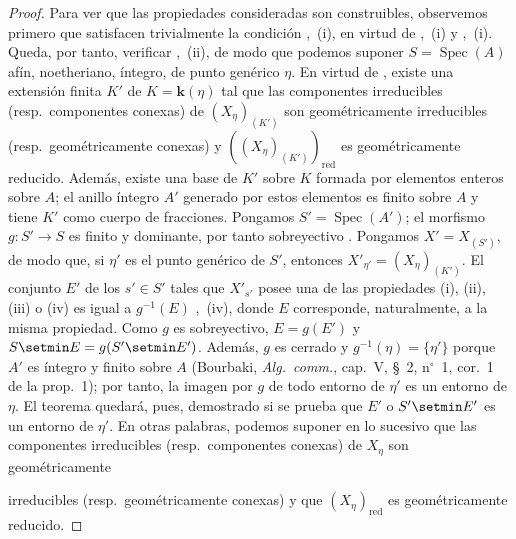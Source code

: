 \begin{proof}
Para ver que las propiedades consideradas son construibles, observemos primero que satisfacen trivialmente la condición ,~(i), en virtud de ,~(i) y ,~(i).
Queda, por tanto, verificar ,~(ii), de modo que podemos suponer $S=\operatorname{Spec}(A)$ afín, noetheriano, íntegro, de punto genérico $\eta$.
En virtud de , existe una extensión finita $K'$ de $K=\boldsymbol{k}(\eta)$ tal que las componentes irreducibles (resp.\ componentes conexas) de $(X_\eta)_{(K')}$ son geométricamente irreducibles (resp.\ geométricamente conexas) y $((X_\eta)_{(K')})_\mathrm{red}$ es geométricamente reducido.
Además, existe una base de $K'$ sobre $K$ formada por elementos enteros sobre $A$; el anillo íntegro $A'$ generado por estos elementos es finito sobre $A$ y tiene $K'$ como cuerpo de fracciones.
Pongamos $S'=\operatorname{Spec}(A')$; el morfismo $g:S'\to S$ es finito y dominante, por tanto sobreyectivo . Pongamos $X'=X_{(S')}$, de modo que, si $\eta'$ es el punto genérico de $S'$, entonces $X'_{\eta'}=(X_\eta)_{(K')}$. El conjunto $E'$ de los $s'\in S'$ tales que $X'_{s'}$ posee una de las propiedades (i), (ii), (iii) o (iv) es igual a $g^{-1}(E)$ ,~(iv), donde $E$ corresponde, naturalmente, a la misma propiedad. Como $g$ es sobreyectivo, $E=g(E')$ y $S\setmin E=g(S'\setmin E')$. Además, $g$ es cerrado y $g^{-1}(\eta)=\{\eta'\}$ porque $A'$ es íntegro y finito sobre $A$ (Bourbaki, \emph{Alg.\ comm.}, cap.\ V, \S~2, n$^\circ$~1, cor.\ 1 de la prop.\ 1); por tanto, la imagen por $g$ de todo entorno de $\eta'$ es un entorno de $\eta$.
El teorema quedará, pues, demostrado si se prueba que $E'$ o $S'\setmin E'$ es un entorno de $\eta'$.
En otras palabras, podemos suponer en lo sucesivo que las componentes irreducibles (resp.\ componentes conexas) de $X_\eta$ son geométricamente


irreducibles (resp.\ geométricamente conexas) y que $(X_\eta)_\mathrm{red}$ es geométricamente reducido.


\end{proof}
